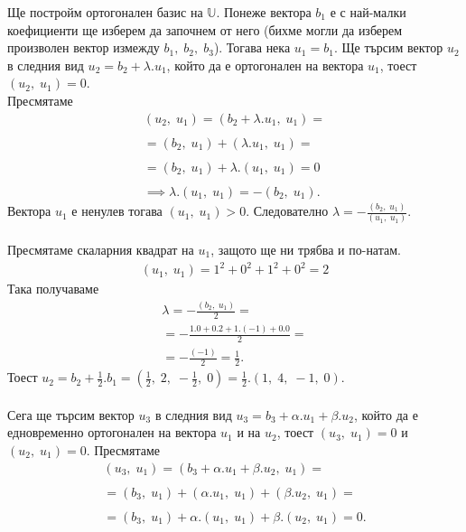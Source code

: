 \documentclass[a4paper, 12pt]{article}
\begin{document}
    Ще постройм ортогонален базис на $\mathbb{U}$.
    Понеже вектора $b_1$ е с най-малки коефициенти ще изберем
    да започнем от него (бихме могли да изберем произволен вектор измежду
    $b_1, \; b_2, \; b_3$). Тогава нека $u_1 = b_1$. Ще търсим вектор
    $u_2$ в следния вид $u_2 = b_2 + \lambda.u_1$, който да е ортогонален
    на вектора $u_1$, тоест $(u_2, \; u_1) = 0$. \\
    Пресмятаме
    \begin{align*}
        (u_2, \; u_1) = (b_2 + \lambda.u_1, \; u_1) = \\\\
        = (b_2, \; u_1) + (\lambda.u_1, \; u_1) = \\\\
        = (b_2, \; u_1) + \lambda.(u_1, \; u_1) = 0 \\\\
        \implies \lambda.(u_1, \; u_1) = -(b_2, \; u_1).
    \end{align*}
    Вектора $u_1$ е ненулев тогава $(u_1, \; u_1) > 0$. Следователно
    $\lambda = -\frac{(b_2, \; u_1)}{(u_1, \; u_1)}$. \\\\
    Пресмятаме скаларния квадрат на $u_1$, защото ще ни трябва
    и по-натам.
    \begin{align*}
        (u_1, \; u_1) = 1^2 + 0^2 + 1^2 + 0^2 = 2 
    \end{align*}
    Така получаваме
    \begin{align*}
        \lambda = -\frac{(b_2, \; u_1)}{2} = \\
        = -\frac{1.0 + 0.2 + 1.(-1) + 0.0}{2} = \\
        = -\frac{(-1)}{2} = \frac{1}{2}.
    \end{align*}
    Тоест $u_2 = b_2 + \frac{1}{2}.b_1
    = (\frac{1}{2}, \; 2, \; -\frac{1}{2}, \; 0) = \frac{1}{2}.(1, \; 4, \; -1, \; 0)$. \\\\
    Сега ще търсим вектор $u_3$ в следния вид
    $u_3 = b_3 + \alpha.u_1 + \beta.u_2$, който да е едновременно ортогонален
    на вектора $u_1$ и на $u_2$, тоест $(u_3, \; u_1) = 0$ и $(u_2, \; u_1) = 0$.
    Пресмятаме
    \begin{align*}
        (u_3, \; u_1) = (b_3 + \alpha.u_1 + \beta.u_2, \; u_1) = \\\\
        = (b_3, \; u_1) + (\alpha.u_1, \; u_1) + (\beta.u_2, \; u_1) = \\\\
        = (b_3, \; u_1) + \alpha.(u_1, \; u_1) + \beta.(u_2, \; u_1) = 0.
    \end{align*}
\end{document}
